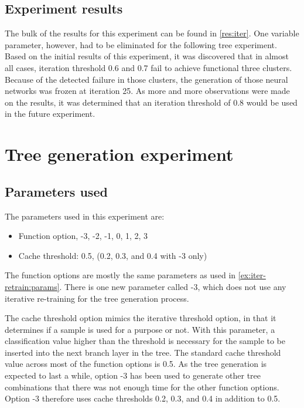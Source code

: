 \subsection{Experiment results}
The bulk of the results for this experiment can be found in \cref{res:iter}.
One variable parameter, however, had to be eliminated for the following tree experiment.
Based on the initial results of this experiment, it was discovered that in almost all cases, iteration threshold 0.6 and 0.7 fail to achieve functional three clusters.
Because of the detected failure in those clusters, the generation of those neural networks was frozen at iteration 25.
As more and more observations were made on the results, it was determined that an iteration threshold of 0.8 would be used in the future experiment.


\section{Tree generation experiment}
\label{ex:tree}
\subsection{Parameters used}
\label{ex:treeparam}

The parameters used in this experiment are:

\begin{itemize}
    \item Function option, -3, -2, -1, 0, 1, 2, 3
    \item Cache threshold: 0.5, (0.2, 0.3, and 0.4 with -3 only)
\end{itemize}{}

The function options are mostly the same parameters as used in \cref{ex:iter-retrain:params}.
There is one new parameter called -3, which does not use any iterative re-training for the tree generation process.

The cache threshold option mimics the iterative threshold option, in that it determines if a sample is used for a purpose or not.
With this parameter, a classification value higher than the threshold is necessary for the sample to be inserted into the next branch layer in the tree.
The standard cache threshold value across most of the function options is 0.5.
As the tree generation is expected to last a while, option -3 has been used to generate other tree combinations that there was not enough time for the other function options.
Option -3 therefore uses cache thresholds 0.2, 0.3, and 0.4 in addition to 0.5.


